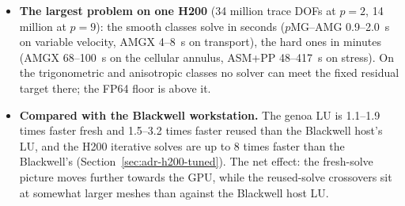 \begin{itemize}
\begin{itemize}
  \item ASM+PP wins transport and the cellular annulus at L5 and the closed-loop stress case at
    L5--L7, where only the block preconditioners were run; BJ+PP takes stress at L7, $p=2$.
  \end{itemize}
  LU's memory is not the limit on a genoa node (at most 141~GiB at L7, out of 754~GiB). Its
  time is: 36--53~s fresh at L7, against 1.0--1.2~s for $p$MG--AMG on variable velocity and
  5.2--5.5~s for AMGX on transport.
\item \textbf{The largest problem on one H200} (34 million trace DOFs at $p=2$, 14 million at
  $p=9$): the smooth classes solve in seconds ($p$MG--AMG 0.9--2.0~s on variable velocity, AMGX
  4--8~s on transport), the hard ones in minutes (AMGX 68--100~s on the cellular annulus, ASM+PP
  48--417~s on stress). On the trigonometric and anisotropic classes no solver can meet the fixed
  residual target there; the FP64 floor is above it.
\item \textbf{Compared with the Blackwell workstation.} The genoa LU is 1.1--1.9 times faster
  fresh and 1.5--3.2 times faster reused than the Blackwell host's LU, and the H200 iterative
  solves are up to 8 times faster than the Blackwell's (Section~\ref{sec:adr-h200-tuned}). The
  net effect: the fresh-solve picture moves further towards the GPU, while the reused-solve
  crossovers sit at somewhat larger meshes than against the Blackwell host LU.
\end{itemize}

